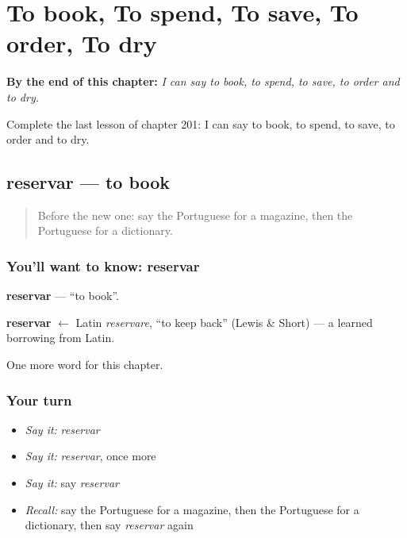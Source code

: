 
\chapter{To book, To spend, To save, To order, To dry}
\label{ch:pt-to-book-to-spend-to-save-to-order-to-dry}

\begin{chapteropening}
\textbf{By the end of this chapter:} \emph{I can say to book, to spend, to save, to order and to dry.}

Complete the last lesson of chapter 201: I can say to book, to spend, to save, to order and to dry.
\end{chapteropening}

\section[reservar]{reservar — to book}

\label{lesson:PT-C201-reservar}



\begin{quote}
Before the new one: say the Portuguese for a magazine, then the Portuguese for a dictionary.
\end{quote}

\subsection*{You'll want to know: reservar}
\textbf{reservar} — \textquotedblleft{}to book\textquotedblright{}.

\begin{cousinweb}
\textbf{reservar} $\leftarrow$ Latin \emph{reservare}, \textquotedblleft{}to keep back\textquotedblright{} (Lewis \& Short) — a learned borrowing from Latin.
\end{cousinweb}

\begin{grammarlens}[title={What you've built}]
One more word for this chapter.
\end{grammarlens}

\subsection*{Your turn}
\begin{itemize}
\raggedright
  \item \emph{Say it:} \emph{reservar}
  \item \emph{Say it:} \emph{reservar}, once more
  \item \emph{Say it:} say \emph{reservar}
  \item \emph{Recall:} say the Portuguese for a magazine, then the Portuguese for a dictionary, then say \emph{reservar} again
\end{itemize}

